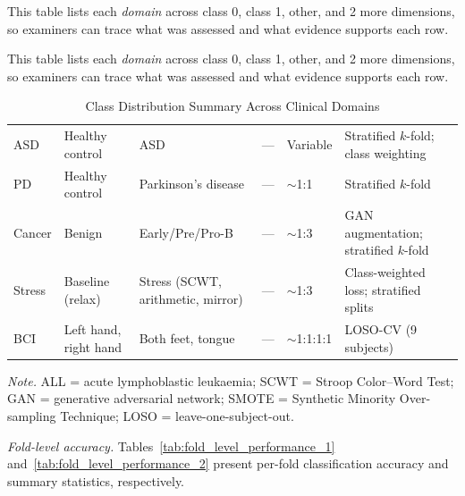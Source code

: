 \noindent This table lists each \textit{domain} across class 0, class 1, other, and 2 more dimensions, so examiners can trace what was assessed and what evidence supports each row.


\noindent This table lists each \textit{domain} across class 0, class 1, other, and 2 more dimensions, so examiners can trace what was assessed and what evidence supports each row.



{\tablestripes\tablefontsize
\begin{xltabular}{\textwidth}{@{} >{\raggedright\arraybackslash}p{1.1cm} >{\raggedright\arraybackslash}p{1.4cm} L >{\raggedright\arraybackslash}p{1.0cm} >{\raggedright\arraybackslash}p{1.2cm} L @{}}
\caption[Class Distribution Summary Across Clinical Domains]{Class Distribution Summary Across Clinical Domains}\label{tab:class_distribution} \\
\toprule
{} &  &  &  &  &  \\
\midrule
\endfirsthead
\endhead
\bottomrule
\endlastfoot
ASD & Healthy control & ASD & --- & Variable & Stratified $k$-fold; class weighting \\
\addlinespace
PD & Healthy control & Parkinson's disease & --- & $\sim$1:1 & Stratified $k$-fold \\
\addlinespace
Cancer & Benign & Early/Pre/Pro-B & --- & $\sim$1:3 & GAN augmentation; stratified $k$-fold \\
\addlinespace
Stress & Baseline (relax) & Stress (SCWT, arithmetic, mirror) & --- & $\sim$1:3 & Class-weighted loss; stratified splits \\
\addlinespace
BCI & Left hand, right hand & Both feet, tongue & --- & $\sim$1:1:1:1 & LOSO-CV (9 subjects) \\
\end{xltabular}}
\vspace{0.5em}\noindent\textit{Note.} ALL = acute lymphoblastic leukaemia; SCWT = Stroop Color--Word Test; GAN = generative adversarial network; SMOTE = Synthetic Minority Over-sampling Technique; LOSO = leave-one-subject-out.
\fi %

\noindent\textit{Fold-level accuracy.} Tables~\ref{tab:fold_level_performance_1} and~\ref{tab:fold_level_performance_2} present per-fold classification accuracy and summary statistics, respectively.

\iffalse %


